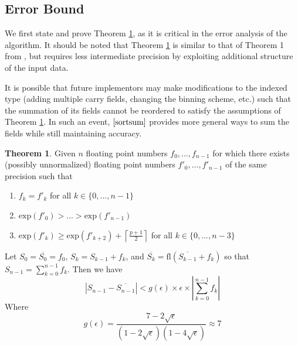 \documentclass[12pt]{article}
\providecommand{\ceil}[1]{\left \lceil #1 \right \rceil }
\providecommand{\exp}{\ensuremath{\text{exp}}}
\providecommand{\fl}{\ensuremath{\text{fl}}}
\theoremstyle{definition}
\newtheorem{thm}{Theorem}[section]
\numberwithin{equation}{section}
\numberwithin{figure}{section}
\begin{document}
  \subsection{Error Bound}
    \label{sec:primitiveops_error}

    We first state and prove Theorem \ref{thm:mysortsum}, as it is critical in the error analysis of the algorithm. It should be noted that Theorem \ref{thm:mysortsum} is similar to that of Theorem 1 from \cite{sortsum}, but requires less intermediate precision by exploiting additional structure of the input data.

    It is possible that future implementors may make modifications to the indexed type (adding multiple carry fields, changing the binning scheme, etc.) such that the summation of its fields cannot be reordered to satisfy the assumptions of Theorem \ref{thm:mysortsum}. In such an event, $\cite{sortsum}$ provides more general ways to sum the fields while still maintaining accuracy.
      \begin{samepage}
    \begin{thm}
      Given $n$ floating point numbers $f_0, ..., f_{n - 1}$ for which there exists (possibly unnormalized) floating point numbers $f'_0, ..., f'_{n - 1}$ of the same precision such that
      \begin{enumerate}
        \item $f_k = f'_k$ for all $k \in \{0, ..., n - 1\}$
        \item $\exp(f'_0) > ... > \exp(f'_{n - 1})$
        \item $\exp(f'_k) \geq \exp(f'_{k + 2}) + \ceil{\frac{p + 1}{2}}$ for all $k \in \{0, ..., n - 3\}$
      \end{enumerate}
      \label{thm:mysortsum}
      Let $S_0 = \overline{S_0} = f_0$, $S_k = S_{k - 1} + f_k$, and $\overline{S_k} = \fl(\overline{S_{k - 1}} + f_k)$ so that $S_{n - 1} = \sum \limits_{k = 0}^{n - 1} f_k$.
      Then we have
      \begin{equation*}
        |S_{n - 1} - \overline{S_{n - 1}}| < g(\epsilon) \times \epsilon \times |\sum\limits_{k = 0}^{n - 1}f_k|
      \end{equation*}
      Where
      \begin{equation}
        g(\epsilon) = \frac{7 - 2\sqrt\epsilon}{(1 - 2\sqrt\epsilon)(1 - 4\sqrt\epsilon)} \approx 7
        \label{eq:g}
      \end{equation}
    \end{thm}
    \end{samepage}
\end{document}
